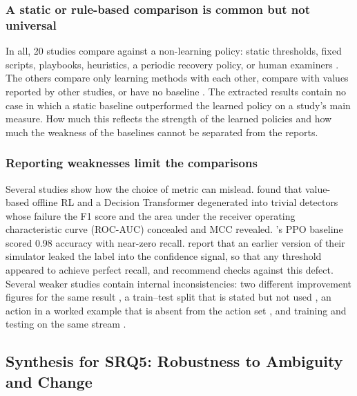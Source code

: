 \documentclass[pdflatex,sn-basic]{sn-jnl}
\begin{document}
\subsubsection{A static or rule-based comparison is common but not universal}

In all, 20 studies compare against a non-learning policy: static thresholds, fixed scripts, playbooks, heuristics, a periodic recovery policy, or human examiners \citep{hammar2026belief,koupaei2026,bhosale2026,wu2026,yuan2026,aenugu2026,ghanem2026}. The others compare only learning methods with each other, compare with values reported by other studies, or have no baseline \citep{saeed2025,noorulhassan2026,khozam2025,elicha2026,hughes2022,jaber2025,alturkistani2022}. The extracted results contain no case in which a static baseline outperformed the learned policy on a study's main measure. How much this reflects the strength of the learned policies and how much the weakness of the baselines cannot be separated from the reports.

\subsubsection{Reporting weaknesses limit the comparisons}

Several studies show how the choice of metric can mislead. \citet{okafor2026} found that value-based offline RL and a Decision Transformer degenerated into trivial detectors whose failure the F1 score and the area under the receiver operating characteristic curve (ROC-AUC) concealed and MCC revealed. \citeauthor{ravi2025}'s \citeyearpar{ravi2025} PPO baseline scored 0.98 accuracy with near-zero recall. \citet{sahin2026} report that an earlier version of their simulator leaked the label into the confidence signal, so that any threshold appeared to achieve perfect recall, and recommend checks against this defect. Several weaker studies contain internal inconsistencies: two different improvement figures for the same result \citep{koupaei2026,varsha2025}, a train--test split that is stated but not used \citep{bhosale2026}, an action in a worked example that is absent from the action set \citep{jaber2025}, and training and testing on the same stream \citep{alturkistani2022}.

\subsection{Synthesis for SRQ5: Robustness to Ambiguity and Change}
\end{document}
